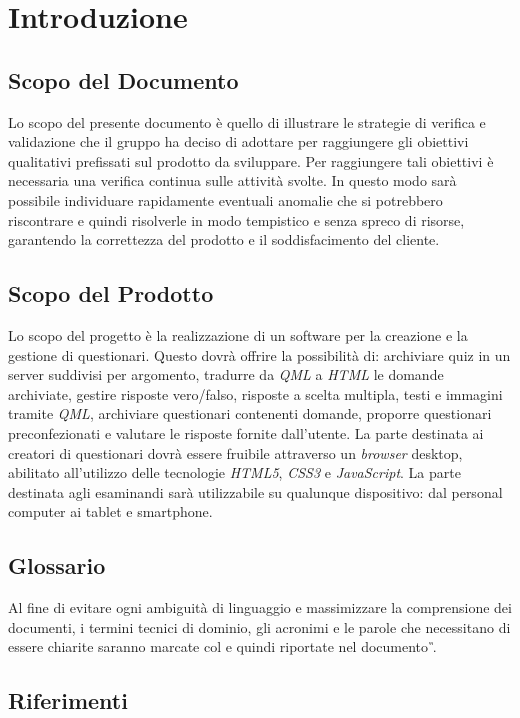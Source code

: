 \newpage
\section{Introduzione}
\subsection{Scopo del Documento}
Lo scopo del presente documento è quello di illustrare le strategie di verifica e validazione che il gruppo \gruppo \hspace{1mm} ha deciso di adottare per raggiungere gli obiettivi qualitativi prefissati sul prodotto da sviluppare. Per raggiungere tali obiettivi è necessaria una verifica continua sulle attività svolte. In questo modo sarà possibile individuare rapidamente eventuali anomalie che si potrebbero riscontrare e quindi risolverle in modo tempistico e senza spreco di risorse, garantendo la correttezza del prodotto e il soddisfacimento del cliente.

\subsection{Scopo del Prodotto}
Lo scopo del progetto è la realizzazione di un software per la creazione e la gestione di questionari. Questo dovrà offrire la possibilità di: archiviare quiz in un server suddivisi per argomento, tradurre da \textit{QML} a \textit{HTML} le domande archiviate, gestire risposte vero/falso, risposte a scelta multipla, testi e immagini tramite \textit{QML}, archiviare questionari contenenti domande, proporre questionari preconfezionati e valutare le risposte fornite dall’utente.
La parte destinata ai creatori di questionari dovrà essere fruibile attraverso un \textit{browser} desktop, abilitato all’utilizzo delle tecnologie \textit{HTML5}, \textit{CSS3} e \textit{JavaScript}.
La parte destinata agli esaminandi sarà utilizzabile su qualunque dispositivo: dal personal computer ai tablet e smartphone.

\subsection{Glossario}
Al fine di evitare ogni ambiguità di linguaggio e massimizzare la comprensione dei documenti, i termini tecnici di dominio, gli acronimi e le parole che necessitano di essere chiarite saranno marcate col  e quindi riportate nel documento \textit{\G}.
\subsection{Riferimenti}

